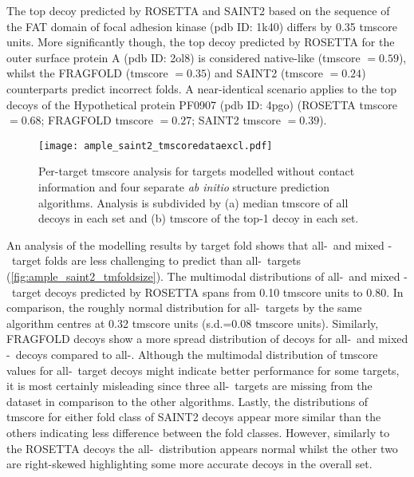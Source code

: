 The top decoy predicted by ROSETTA and SAINT2 based on the sequence of the FAT domain of focal adhesion kinase (\gls{pdb} ID: 1k40) differs by 0.35 \gls{tmscore} units. More significantly though, the top decoy predicted by ROSETTA for the outer surface protein A (\gls{pdb} ID: 2ol8) is considered native-like (\gls{tmscore} $=0.59$), whilst the FRAGFOLD (\gls{tmscore} $=0.35$) and SAINT2 (\gls{tmscore} $=0.24$) counterparts predict incorrect folds. A near-identical scenario applies to the top decoys of the Hypothetical protein PF0907 (\gls{pdb} ID: 4pgo) (ROSETTA \gls{tmscore} $=0.68$; FRAGFOLD \gls{tmscore} $=0.27$; SAINT2 \gls{tmscore} $=0.39$).

\begin{figure}[H]
    \centering
    \texttt{[image: ample\_saint2\_tmscoredataexcl.pdf]}
    \caption[Per-target TM-score analysis for four modelling algorithms without contacts]{Per-target \gls{tmscore} analysis for targets modelled without contact information and four separate \textit{ab initio} structure prediction algorithms. Analysis is subdivided by (a) median \gls{tmscore} of all decoys in each set and (b) \gls{tmscore} of the top-1 decoy in each set.}
    \label{fig:ample_saint2_tmscoredataexcl}
\end{figure}

An analysis of the modelling results by target fold shows that all-\textalpha\ and mixed \textalpha-\textbeta\ target folds are less challenging to predict than all-\textbeta\ targets (\cref{fig:ample_saint2_tmfoldsize}). The multimodal distributions of all-\textalpha\ and mixed \textalpha-\textbeta\ target decoys predicted by ROSETTA spans from 0.10 \gls{tmscore} units to 0.80. In comparison, the roughly normal distribution for all-\textbeta\ targets by the same algorithm centres at 0.32 \gls{tmscore} units (s.d.=0.08 \gls{tmscore} units). Similarly, FRAGFOLD decoys show a more spread distribution of decoys for all-\textalpha\ and mixed \textalpha-\textbeta\ decoys compared to all-\textbeta. Although the multimodal distribution of \gls{tmscore} values for all-\textbeta\ target decoys might indicate better performance for some targets, it is most certainly misleading since three all-\textbeta\ targets are missing from the dataset in comparison to the other algorithms. Lastly, the distributions of \gls{tmscore} for either fold class of SAINT2 decoys appear more similar than the others indicating less difference between the fold classes. However, similarly to the ROSETTA decoys the all-\textbeta\ distribution appears normal whilst the other two are right-skewed highlighting some more accurate decoys in the overall set.

